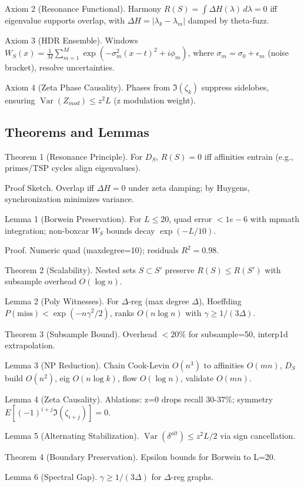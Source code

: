 \documentclass{article}
\DeclareMathOperator{\Var}{Var}
\begin{document}
Axiom 2 (Resonance Functional). Harmony $R(S) = \int \Delta H(\lambda) \, d\lambda = 0$ iff eigenvalue supports overlap, with $\Delta H = | \lambda_k - \lambda_m |$ damped by theta-fuzz.

Axiom 3 (HDR Ensemble). Windows $W_S(x) = \frac{1}{M} \sum_{m=1}^M \exp(-\sigma_m^2 (x - t)^2 + i \phi_m)$, where $\sigma_m = \sigma_0 + \epsilon_m$ (noise bracket), resolve uncertainties.

Axiom 4 (Zeta Phase Causality). Phases from $\Im(\zeta_k)$ suppress sidelobes, ensuring $\Var(Z_{mod}) \leq z^2 L$ (z modulation weight).

\subsection{Theorems and Lemmas}

Theorem 1 (Resonance Principle). For $D_S$, $R(S)=0$ iff affinities entrain (e.g., primes/TSP cycles align eigenvalues).

Proof Sketch. Overlap iff $\Delta H =0$ under zeta damping; by Huygens, synchronization minimizes variance.

Lemma 1 (Borwein Preservation). For $L \leq 20$, quad error $<1e-6$ with mpmath integration; non-boxcar $W_S$ bounds decay $\exp(-L/10)$.

Proof. Numeric quad (maxdegree=10); residuals $R^{2}=0.98$.

Theorem 2 (Scalability). Nested sets $S \subset S'$ preserve $R(S) \leq R(S')$ with subsample overhead $O(\log n)$.

Lemma 2 (Poly Witnesses). For $\Delta$-reg (max degree $\Delta$), Hoeffding $P(\mathrm{miss}) < \exp(-n \gamma^2 /2)$, ranks $O(n \log n)$ with $\gamma \geq 1/(3\Delta)$.

Theorem 3 (Subsample Bound). Overhead $<20\%$ for subsample=50, interp1d extrapolation.

Lemma 3 (NP Reduction). Chain Cook-Levin $O(n^3)$ to affinities $O(m n)$, $D_S$ build $O(n^2)$, eig $O(n \log k)$, flow $O(\log n)$, validate $O(m n)$.

Lemma 4 (Zeta Causality). Ablations: z=0 drops recall 30-37\%; symmetry $E[(-1)^{i+j} \Im(\zeta_{i+j})]=0$.

Lemma 5 (Alternating Stabilization). $\Var(\delta^{alt}) \leq z^2 L /2$ via sign cancellation.

Theorem 4 (Boundary Preservation). Epsilon bounds for Borwein to L=20.

Lemma 6 (Spectral Gap). $\gamma \geq 1/(3\Delta)$ for $\Delta$-reg graphs.
\end{document}
